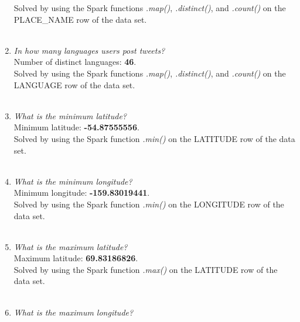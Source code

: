 \documentclass{article}
\begin{document}
\begin{enumerate}[label=\alph*)]
    Solved by using the Spark functions \textit{.map()}, \textit{.distinct()}, and \textit{.count()} on the PLACE\_NAME row of the data set.\\ \\
    
    
    \item \textit{In how many languages users post tweets?}\\
    
    Number of distinct languages: \textbf{46}.\\
    
    Solved by using the Spark functions \textit{.map()}, \textit{.distinct()}, and \textit{.count()} on the LANGUAGE row of the data set.\\ \\
    
    
    \item \textit{What is the minimum latitude?}\\
    
    Minimum latitude: \textbf{-54.87555556}.\\
    
    Solved by using the Spark function \textit{.min()} on the LATITUDE row of the data set.\\ \\
    
    
    \item \textit{What is the minimum longitude?}\\
    
    Minimum longitude: \textbf{-159.83019441}.\\
    
    Solved by using the Spark function \textit{.min()} on the LONGITUDE row of the data set.\\ \\
    
    
    \item \textit{What is the maximum latitude?}\\
    
    Maximum latitude: \textbf{69.83186826}.\\
    
    Solved by using the Spark function \textit{.max()} on the LATITUDE row of the data set.\\ \\
    
    
    \item \textit{What is the maximum longitude?}\\
    

\end{enumerate}
\end{document}
